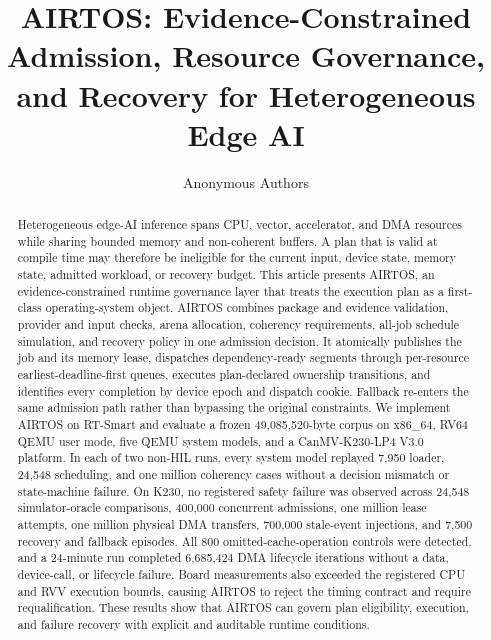 \documentclass[lettersize,journal]{IEEEtran}
\begin{document}
\title{AIRTOS: Evidence-Constrained Admission, Resource Governance, and Recovery for Heterogeneous Edge AI}

\author{Anonymous Authors}

\maketitle

\begin{abstract}
Heterogeneous edge-AI inference spans CPU, vector, accelerator, and DMA
resources while sharing bounded memory and non-coherent buffers. A plan that
is valid at compile time may therefore be ineligible for the current input,
device state, memory state, admitted workload, or recovery budget. This
article presents AIRTOS, an evidence-constrained runtime governance layer that
treats the execution plan as a first-class operating-system object. AIRTOS
combines package and evidence validation, provider and input checks, arena
allocation, coherency requirements, all-job schedule simulation, and recovery
policy in one admission decision. It atomically publishes the job and its
memory lease, dispatches dependency-ready segments through per-resource
earliest-deadline-first queues, executes plan-declared ownership transitions,
and identifies every completion by device epoch and dispatch cookie. Fallback
re-enters the same admission path rather than bypassing the original
constraints. We implement AIRTOS on RT-Smart and evaluate a frozen
49,085,520-byte corpus on x86\_64, RV64 QEMU user mode, five QEMU system models,
and a CanMV-K230-LP4 V3.0 platform. In each of two non-HIL runs, every system
model replayed 7,950 loader, 24,548 scheduling, and one million coherency cases
without a decision mismatch or state-machine failure. On K230, no registered
safety failure was observed across 24,548 simulator-oracle comparisons,
400,000 concurrent admissions, one million lease attempts, one million
physical DMA transfers, 700,000 stale-event injections, and 7,500 recovery and
fallback episodes. All 800 omitted-cache-operation controls were detected,
and a 24-minute run completed 6,685,424 DMA lifecycle iterations without a
data, device-call, or lifecycle failure. Board measurements also exceeded the
registered CPU and RVV execution bounds, causing AIRTOS to reject the timing
contract and require requalification. These results show that AIRTOS can
govern plan eligibility, execution, and failure recovery with explicit and
auditable runtime conditions.
\end{abstract}
\end{document}
